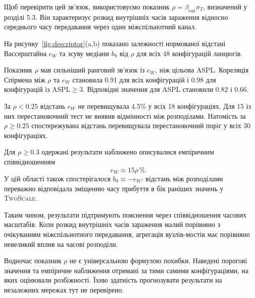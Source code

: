 \documentclass[a4paper,fleqn]{cas-sc}
\newcommand{\TS}{\textup{\textsc{TwoScale}}}
\newcommand{\eW}{e_{W}}
\begin{document}
Щоб перевірити цей зв'язок,
використовуємо показник
$\rho=\beta_{\mathrm{out}}\sigma_T$,
визначений у розділі 5.3.
Він характеризує розкид
внутрішніх часів зараження
відносно середнього часу
передавання через один
міжспільнотний канал.

На рисунку~\ref{fig:descriptor}(a,b)
показано залежності нормованої
відстані Вассерштайна $\eW$
та зсуву медіани $b_9$
від $\rho$ для всіх
48 конфігурацій ланцюгів.

Показник $\rho$ мав сильніший
ранговий зв'язок із $\eW$,
ніж цільова ASPL.
Кореляція Спірмена між
$\rho$ та $\eW$ становила
0.91 для всіх конфігурацій
і 0.98 для конфігурацій
із $\mathrm{ASPL}\geq3$.
Відповідні значення
для ASPL становили 0.82 і 0.66.

За $\rho<0.25$ відстань $\eW$
не перевищувала 4.5\%
у всіх 18 конфігураціях.
Для 15 із них перестановочний
тест не виявив відмінності
між розподілами.
Натомість за $\rho\geq0.25$
спостережувана відстань
перевищувала перестановочний
поріг у всіх 30 конфігураціях.

Для $\rho\geq0.3$
одержані результати наближено
описувалися емпіричним
співвідношенням
\begin{equation}
\eW \approx 15\rho\,\%.
\end{equation}
У цій області також
спостерігалося
$b_9\approx-\eW$:
відстань між розподілами
переважно відповідала
зміщенню часу прибуття
в бік раніших значень
у \TS{}.

Таким чином, результати
підтримують пояснення
через співвідношення
часових масштабів.
Коли розкид внутрішніх
часів зараження малий
порівняно з очікуванням
міжспільнотного передавання,
агрегація вузлів-мостів
має порівняно невеликий
вплив на часові розподіли.

Водночас показник $\rho$
не є універсальною формулою
похибки. Наведені порогові
значення та емпіричне
наближення отримані
за тими самими конфігураціями,
на яких оцінювали розбіжності.
Їхню здатність прогнозувати
результати на незалежних
мережах тут не перевірено.
\end{document}
